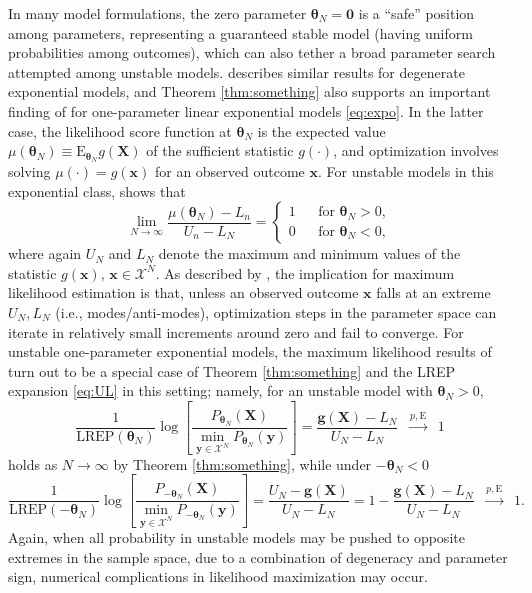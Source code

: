 \documentclass[numbib]{imamat}
\theoremstyle{theorem}
\theoremstyle{lemma}
\theoremstyle{example}
\theoremstyle{corollary}
\theoremstyle{definition}
\theoremstyle{remark}
\theoremstyle{approximation}
\theoremstyle{scheme}
\newcommand{\REP}{\mathrm{LREP}}
\begin{document}
In many model formulations, the zero parameter
\(\boldsymbol \theta_N=\boldsymbol 0\) is a ``safe'' position among
parameters, representing a guaranteed stable model (having uniform
probabilities among outcomes), which can also tether a broad parameter
search attempted among unstable models. \citet{handcock2003assessing}
describes similar results for degenerate exponential models, and Theorem
\ref{thm:something} also supports an important finding of
\citet[Corollary 1]{schweinberger2011instability} for one-parameter
linear exponential models \eqref{eq:expo}. In the latter case, the
likelihood score function at \(\boldsymbol \theta_N\) is the expected
value
\(\mu(\boldsymbol \theta_N)\equiv \mathrm{E}_{\boldsymbol \theta_N} g(\boldsymbol X)\)
of the sufficient statistic \(g(\cdot)\), and optimization involves
solving \(\mu(\cdot)=g(\boldsymbol x)\) for an observed outcome
\(\boldsymbol x\). For unstable models in this exponential class,
\citet[Corollary 1]{schweinberger2011instability} shows that \[
\lim_{N\to \infty}\frac{\mu(\boldsymbol \theta_N) -L_n}{U_n-L_N}= \left\{ \begin{array}{lcl}
1 && \text{for } \boldsymbol \theta_N>0,\\
0 && \text{for } \boldsymbol \theta_N<0, \end{array}\right.
\] where again \(U_N\) and \(L_N\) denote the maximum and minimum values
of the statistic \(g(\boldsymbol x)\),
\(\boldsymbol x\in\mathcal{X}^N\). As described by
\citet{schweinberger2011instability}, the implication for maximum
likelihood estimation is that, unless an observed outcome
\(\boldsymbol x\) falls at an extreme \(U_N, L_N\) (i.e.,
modes/anti-modes), optimization steps in the parameter space can iterate
in relatively small increments around zero and fail to converge. For
unstable one-parameter exponential models, the maximum likelihood
results of \citet{schweinberger2011instability} turn out to be a special
case of Theorem \ref{thm:something} and the LREP expansion \eqref{eq:UL}
in this setting; namely, for an unstable model with
\(\boldsymbol \theta_N>0\), \[
\frac{1}{\REP(\boldsymbol \theta_N)} \log\left[ \frac{P_{\boldsymbol \theta_N }(\boldsymbol X) }{\displaystyle{\min_{\boldsymbol y\in\mathcal{X}^N}} P_{\boldsymbol \theta_N }(\boldsymbol y)}\right] = \frac{\boldsymbol g(\boldsymbol X) - L_N}{U_N-L_N}\;\;\stackrel{p, \mathrm{E}}{\longrightarrow}\;\; 1
\] holds as \(N\to \infty\) by Theorem \ref{thm:something}, while under
\(-\boldsymbol \theta_N<0\) \[
\frac{1}{\REP(-\boldsymbol \theta_N)} \log\left[ \frac{P_{-\boldsymbol \theta_N }(\boldsymbol X) }{\displaystyle{\min_{\boldsymbol y\in\mathcal{X}^N}} P_{-\boldsymbol \theta_N }(\boldsymbol y)}\right] = \frac{U_N -\boldsymbol g(\boldsymbol X)}{U_N-L_N} = 1 - \frac{\boldsymbol g(\boldsymbol X) - L_N}{U_N-L_N} \;\;\stackrel{p, \mathrm{E}}{\longrightarrow}\;\; 1.
\] Again, when all probability in unstable models may be pushed to
opposite extremes in the sample space, due to a combination of
degeneracy and parameter sign, numerical complications in likelihood
maximization may occur.
\end{document}
